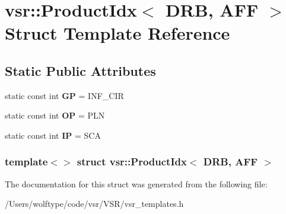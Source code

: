 \hypertarget{structvsr_1_1_product_idx_3_01_d_r_b_00_01_a_f_f_01_4}{\section{vsr\-:\-:Product\-Idx$<$ D\-R\-B, A\-F\-F $>$ Struct Template Reference}
\label{structvsr_1_1_product_idx_3_01_d_r_b_00_01_a_f_f_01_4}
}
\subsection*{Static Public Attributes}
\begin{DoxyCompactItemize}
\item 
\hypertarget{structvsr_1_1_product_idx_3_01_d_r_b_00_01_a_f_f_01_4_aeec885c20ad01d8f3ac10c4e83dbf5c4}{static const int {\bfseries G\-P} = I\-N\-F\-\_\-\-C\-I\-R}\label{structvsr_1_1_product_idx_3_01_d_r_b_00_01_a_f_f_01_4_aeec885c20ad01d8f3ac10c4e83dbf5c4}

\item 
\hypertarget{structvsr_1_1_product_idx_3_01_d_r_b_00_01_a_f_f_01_4_adf720760ad56a1ae574d93ea29281265}{static const int {\bfseries O\-P} = P\-L\-N}\label{structvsr_1_1_product_idx_3_01_d_r_b_00_01_a_f_f_01_4_adf720760ad56a1ae574d93ea29281265}

\item 
\hypertarget{structvsr_1_1_product_idx_3_01_d_r_b_00_01_a_f_f_01_4_a733bc6e4653897174039569e9b88388e}{static const int {\bfseries I\-P} = S\-C\-A}\label{structvsr_1_1_product_idx_3_01_d_r_b_00_01_a_f_f_01_4_a733bc6e4653897174039569e9b88388e}

\end{DoxyCompactItemize}
\subsubsection*{template$<$$>$ struct vsr\-::\-Product\-Idx$<$ D\-R\-B, A\-F\-F $>$}



The documentation for this struct was generated from the following file\-:\begin{DoxyCompactItemize}
\item 
/\-Users/wolftype/code/vsr/\-V\-S\-R/vsr\-\_\-templates.\-h\end{DoxyCompactItemize}
